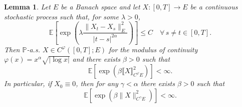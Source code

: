 \documentclass[10pt]{article}
\newtheorem{lemma}[theorem]{Lemma}
\begin{document}
\begin{lemma}
  \label{appendixA2 chaining lemma}Let $E$ be a Banach space and let $X : [0,
  T] \rightarrow E$ be a continuous stochastic process such that, for some
  $\lambda > 0$,
  \[ \mathbb{E} \left[ \exp \left( \lambda \frac{\| X_t - X_s \|^2_E}{| t - s
     |^{2 \alpha}} \right) \right] \leqslant C \quad \forall \, s \neq t \in
     [0, T] . \]
  Then $\mathbb{P}$-a.s. $X \in C^{\varphi} ([0, T] ; E)$ for the modulus of
  continuity $\varphi (x) = x^{\alpha} \sqrt{| \log x |}$ and there exists
  $\beta > 0$ such that
  \[ \mathbb{E} [\exp (\beta \llbracket X \rrbracket^2_{C^{\varphi} E})] <
     \infty . \]
  In particular, if $X_0 \equiv 0$, then for any $\gamma < \alpha$ there
  exists $\beta > 0$ such that
  \[ \mathbb{E} [\exp (\beta \| X \|^2_{C^{\gamma} E})] < \infty . \]
\end{lemma}
\end{document}
